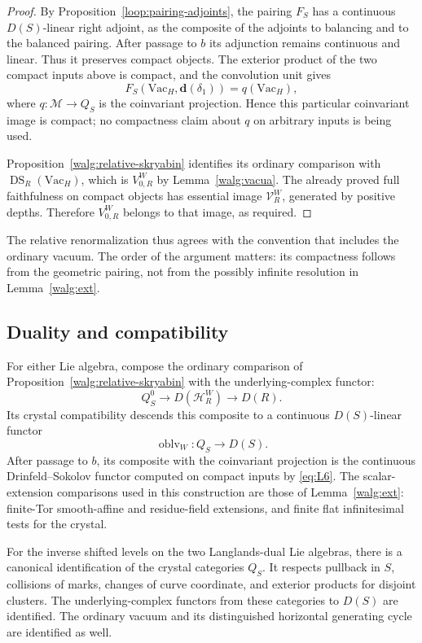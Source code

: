 \begin{proof}
By Proposition~\ref{loop:pairing-adjoints}, the pairing \(F_S\) has a
continuous \(D(S)\)-linear right adjoint, as the composite of the
adjoints to balancing and to the balanced pairing.  After passage to
\(b\) its adjunction remains continuous and linear.  Thus it
preserves compact objects.  The exterior product of the two compact
inputs above is compact, and the convolution unit gives
\[
 F_S(\mathrm{Vac}_H,\mathbf d(\delta_1))
      =q(\mathrm{Vac}_H),
\]
where \(q:\mathcal M\to Q_S\) is the coinvariant projection.
Hence this particular coinvariant image is compact; no compactness
claim about \(q\) on arbitrary inputs is being used.

Proposition~\ref{walg:relative-skryabin} identifies its ordinary
comparison with \(\operatorname{DS}_R(\mathrm{Vac}_H)\), which is
\(V_{0,R}^W\) by Lemma~\ref{walg:vacua}.  The already proved
full faithfulness on compact objects has essential image
\(\mathcal V_R^W\), generated by positive depths.  Therefore
\(V_{0,R}^W\) belongs to that image, as required.
\end{proof}

The relative renormalization thus agrees with the convention that
includes the ordinary vacuum.  The order of the argument matters:
its compactness follows from the geometric pairing, not from the
possibly infinite resolution in Lemma~\ref{walg:ext}.

\subsection{Duality and compatibility}

For either Lie algebra, compose the ordinary comparison of
Proposition~\ref{walg:relative-skryabin} with the underlying-complex
functor:
\[
 Q_S^0\longrightarrow D(\mathcal H_R^W)\longrightarrow D(R).
\]
Its crystal compatibility descends this composite to a continuous
\(D(S)\)-linear functor
\begin{equation}\label{eq:walg-forgetful}
 \operatorname{oblv}_W:Q_S\longrightarrow D(S).
\end{equation}
After passage to \(b\), its composite with the coinvariant projection
is the continuous Drinfeld--Sokolov functor computed on compact
inputs by \eqref{eq:L6}.  The scalar-extension comparisons used in
this construction are those of Lemma~\ref{walg:ext}: finite-Tor
smooth-affine and residue-field extensions, and finite flat
infinitesimal tests for the crystal.

\begin{theorem}\label{walg:common-target}
For the inverse shifted levels on the two Langlands-dual Lie
algebras, there is a canonical identification of the crystal
categories \(Q_S\).  It respects pullback in \(S\), collisions of
marks, changes of curve coordinate, and exterior products for
disjoint clusters.  The underlying-complex functors from these
categories to \(D(S)\) are identified.  The ordinary vacuum and its
distinguished horizontal generating cycle are identified as well.
\end{theorem}

